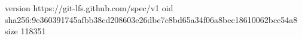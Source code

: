 version https://git-lfs.github.com/spec/v1
oid sha256:9e360391745afbb38cd208603e26dbe7c8bd65a34f06a8bec18610062bcc54a8
size 118351
